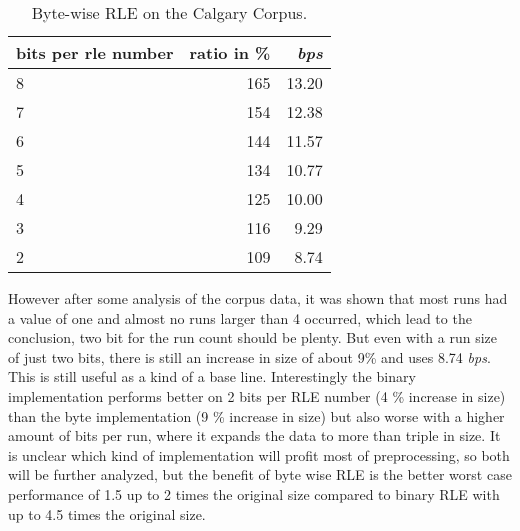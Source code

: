 \begin{table}[h]
	\centering
	\begin{tabular}{l|r|r}
		bits per rle number &  ratio in \% & \textit{bps}\\
		\hline
		8 & 165 & 13.20 \\
		7 & 154 & 12.38\\
		6 & 144 & 11.57 \\
		5 & 134 & 10.77\\
		4 & 125 & 10.00\\
		3 & 116 & 9.29\\
		2 & 109 & 8.74 \\
	\end{tabular}
	\caption{Byte-wise RLE on the Calgary Corpus.}
	\label{tab:t31 Byte-wise RLE on the Calgary Corpus}
\end{table}


\par{
 However after some analysis of the corpus data, it was shown that most runs had a value of one and almost no runs larger than 4 occurred, which lead to the conclusion, two bit for the run count should be plenty. But even with a run size of just two bits, there is still an increase in size of about 9\% and uses 8.74 \textit{bps}. This is still useful as a kind of a base line. Interestingly the binary implementation performs better on 2 bits per RLE number (4 \% increase in size) than the byte implementation (9 \% increase in size) but also worse with a higher amount of bits per run, where it expands the data to more than triple in size. It is unclear which kind of implementation will profit most of preprocessing, so both will be further analyzed, but the benefit of byte wise RLE is the better worst case performance of 1.5 up to 2 times the original size compared to binary RLE with up to 4.5 times the original size.
}

